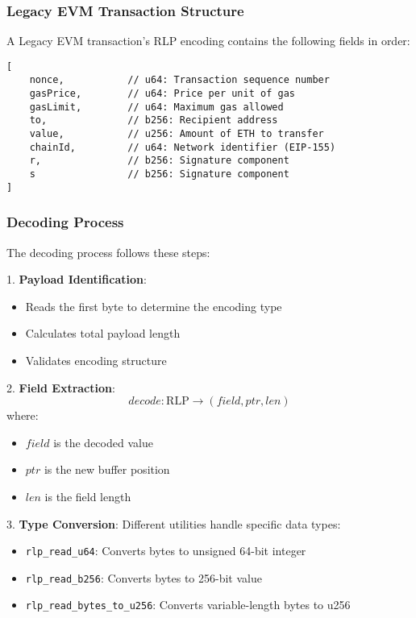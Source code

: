 
\subsubsection{Legacy EVM Transaction Structure}
A Legacy EVM transaction's RLP encoding contains the following fields in order:
\begin{lstlisting}
[
    nonce,           // u64: Transaction sequence number
    gasPrice,        // u64: Price per unit of gas
    gasLimit,        // u64: Maximum gas allowed
    to,              // b256: Recipient address
    value,           // u256: Amount of ETH to transfer
    chainId,         // u64: Network identifier (EIP-155)
    r,               // b256: Signature component
    s                // b256: Signature component
]
\end{lstlisting}

\subsubsection{Decoding Process}
The decoding process follows these steps:

1. \textbf{Payload Identification}:
\begin{itemize}
    \item Reads the first byte to determine the encoding type
    \item Calculates total payload length
    \item Validates encoding structure
\end{itemize}

2. \textbf{Field Extraction}:
\[ decode: \text{RLP} \rightarrow (field, ptr, len) \]
where:
\begin{itemize}
    \item $field$ is the decoded value
    \item $ptr$ is the new buffer position
    \item $len$ is the field length
\end{itemize}

3. \textbf{Type Conversion}:
Different utilities handle specific data types:
\begin{itemize}
    \item \texttt{rlp\_read\_u64}: Converts bytes to unsigned 64-bit integer
    \item \texttt{rlp\_read\_b256}: Converts bytes to 256-bit value
    \item \texttt{rlp\_read\_bytes\_to\_u256}: Converts variable-length bytes to u256
\end{itemize}

